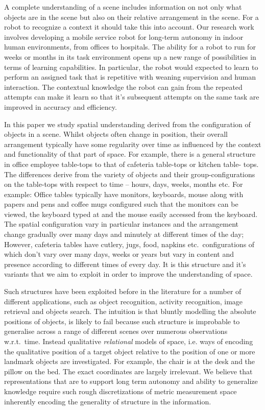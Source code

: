 \documentclass[letterpaper, 10 pt, conference]{ieeeconf}  %
\begin{document}
A complete understanding of a scene includes information on not only 
what objects are in the scene but also on their relative arrangement in
the scene. For a robot to recognize a context it should take this into
account.  Our research work involves developing
a mobile service robot for long-term autonomy in indoor human
environments, from offices to hospitals.  The ability for a robot to
run for weeks or months in its task environment opens up a new range
of possibilities in terms of learning capabilities. In particular, the
robot would expected to learn to perform an assigned task that is
repetitive with weaning supervision and human interaction. The
contextual knowledge the robot can gain from the repeated attempts can
make it learn so that it's subsequent attempts on the same task are
improved in accuracy and efficiency.

In this paper we study spatial understanding derived from the configuration of objects in a scene. Whilst objects often change in position, their overall arrangement typically have some regularity over time as influenced by the context and functionality of that part of space.
For example, there is a general structure in office employee table-tops to that of cafeteria table-tops or kitchen table-
tops. The differences derive from the variety of objects and their group-configurations on the table-tops with respect to time -- hours, 
days, weeks, months etc. For example: Office tables typically have monitors, keyboards, mouse along with papers and pens and coffee mugs 
configured such that the monitors can be viewed, the keyboard typed at and the mouse easily accessed from the keyboard. The spatial 
configuration vary in particular instances and the arrangement change gradually over many days and minutely at different times of the day; 
However, cafeteria tables have cutlery, jugs, food, napkins etc.\ configurations of which don't vary over many days, weeks or years but vary 
in content and presence according to different times of every day. It is this structure and it's variants that we aim to exploit in order to 
improve the understanding of space.

Such structures have been exploited before in the literature for a
number of different applications, such as object recognition, activity
recognition, image retrieval and objects search. The intuition is that
bluntly modelling the absolute positions of objects, is likely to fail
because such structure is improbable to generalise across a range of
different scenes over numerous observations w.r.t.\ time. Instead
qualitative \emph{relational} models of space, i.e. ways of encoding
the qualitative position of a target object relative to the position
of one or more landmark objects are investigated. For example, the
chair is at the desk and the pillow on the bed. The exact coordinates
are largely irrelevant. We believe that representations that are to
support long term autonomy and ability to generalize knowledge require
such rough discretizations of metric measurement space inherently
encoding the generality of structure in the information.
\end{document}
